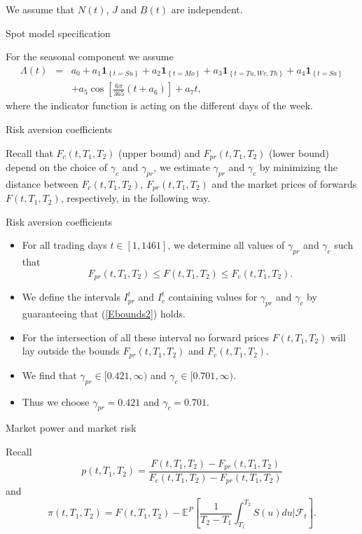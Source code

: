 We assume that $N(t)$, $J$ and $B(t)$ are independent.

{Spot model specification}

For the seasonal component we assume
\begin{eqnarray*}
\Lambda(t) & = & a_0+a_1\textbf{1}_{\left\{t=Su\right\}}+a_2\textbf{1}_{\left\{t=Mo\right\}}+a_3\textbf{1}_{\left\{t=Tu,We,Th\right\}}+a_4\textbf{1}_{\left\{t=Sa\right\}} \\
& & +a_5\cos\left[\frac{6\pi}{365}\left(t+a_6\right)\right]+a_7t,
\end{eqnarray*}
where the indicator function is acting on the different days of the
week.

{Risk aversion coefficients}

Recall that $F_c(t,T_1,T_2)$ (upper bound) and
$F_{pr}(t,T_1,T_2)$ (lower bound) depend on the choice of
$\gamma_{c}$ and $\gamma_{pr}$, we estimate $\gamma_{pr}$ and
$\gamma_{c}$ by minimizing the distance between $F_c(t,T_1,T_2)$,
$F_{pr}(t,T_1,T_2)$ and the market prices of forwards
$F(t,T_1,T_2)$, respectively, in the following way.

{Risk aversion coefficients}

\begin{itemize}
\item For all trading days $t\in[1,1461]$,  we determine all values of $\gamma_{pr}$ and $\gamma_c$
such that
\begin{equation}\label{Ebounds2}
F_{pr}(t,T_1,T_2)\leq F(t,T_1,T_2)\leq F_c(t,T_1,T_2).
\end{equation}
\item
We define the intervals
$I_{pr}^t$ and $I_{c}^t$ containing values for $\gamma_{pr}$ and
$\gamma_{c}$ by guaranteeing that (\ref{Ebounds2}) holds.
\item
For the intersection of all these interval no forward prices $F(t,T_1,T_2)$ will
lay outside the bounds $F_{pr}(t,T_1,T_2)$ and $F_{c}(t,T_1,T_2)$.
\item
We find that $\gamma_{pr}\in  [0.421,\infty)$
and $\gamma_{c}\in [0.701,\infty)$.
\item
Thus we choose $\gamma_{pr}=0.421$ and $\gamma_{c}=0.701$.
\end{itemize}

{Market power and market risk }

Recall
\[p(t,T_1,T_2)=\frac{F(t,T_1,T_2)-F_{pr}(t,T_1,T_2)}{F_c(t,T_1,T_2)-F_{pr}(t,T_1,T_2)}\]
 and
 \[\pi(t,T_1,T_2)=F(t,T_1,T_2)-\mathbb{E}^{P}\left[\frac{1}{T_2-T_1}\int_{T_1}^{T_2}S(u)du|\mathcal{F}_t\right].\]

